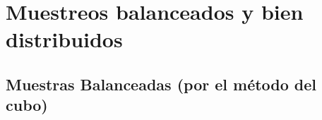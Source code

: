 \documentclass[
  spanish,
  a4paper,
]{scrreprt}
\begin{document}
\begin{table}

\caption{\label{tbl-media_ponderada_notas_estudiantes}Medias de las
notas según tipo de muestra y población}


\end{table}%


\chapter{Muestreos balanceados y bien
distribuidos}\label{muestreos-balanceados-y-bien-distribuidos}

\section{Muestras Balanceadas (por el método del cubo)}\label{sec-cubo}
\end{document}
